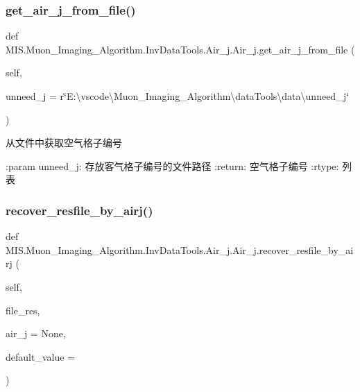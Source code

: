 \subsubsection{\texorpdfstring{get\+\_\+air\+\_\+j\+\_\+from\+\_\+file()}{get\_air\_j\_from\_file()}}
{\footnotesize\ttfamily def M\+I\+S.\+Muon\+\_\+\+Imaging\+\_\+\+Algorithm.\+Inv\+Data\+Tools.\+Air\+\_\+j.\+Air\+\_\+j.\+get\+\_\+air\+\_\+j\+\_\+from\+\_\+file (\begin{DoxyParamCaption}\item[{}]{self,  }\item[{}]{unneed\+\_\+j = {\ttfamily r\char`\"{}E\+:\textbackslash{}vscode\textbackslash{}Muon\+\_\+Imaging\+\_\+Algorithm\textbackslash{}dataTools\textbackslash{}data\textbackslash{}unneed\+\_\+j\char`\"{}} }\end{DoxyParamCaption})}

\begin{DoxyVerb}从文件中获取空气格子编号

:param unneed_j: 存放客气格子编号的文件路径
:return: 空气格子编号
:rtype: 列表
\end{DoxyVerb}
 \mbox{\label{classMIS_1_1Muon__Imaging__Algorithm_1_1InvDataTools_1_1Air__j_1_1Air__j_a2e335009fe6fa19d7056f59bdf44511c}} 
\subsubsection{\texorpdfstring{recover\+\_\+resfile\+\_\+by\+\_\+airj()}{recover\_resfile\_by\_airj()}}
{\footnotesize\ttfamily def M\+I\+S.\+Muon\+\_\+\+Imaging\+\_\+\+Algorithm.\+Inv\+Data\+Tools.\+Air\+\_\+j.\+Air\+\_\+j.\+recover\+\_\+resfile\+\_\+by\+\_\+airj (\begin{DoxyParamCaption}\item[{}]{self,  }\item[{}]{file\+\_\+res,  }\item[{}]{air\+\_\+j = {\ttfamily None},  }\item[{}]{default\+\_\+value = {} }\end{DoxyParamCaption})}

